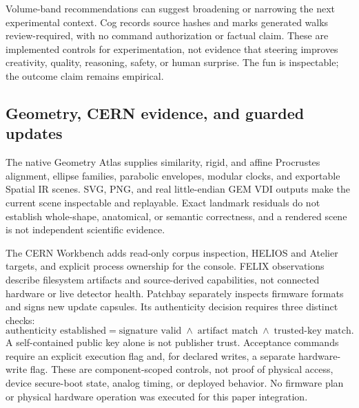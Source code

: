 \documentclass[11pt,a4paper]{article}
\begin{document}
Volume-band recommendations can suggest broadening or narrowing the next experimental context. Cog records source hashes and marks generated walks review-required, with no command authorization or factual claim. These are implemented controls for experimentation, not evidence that steering improves creativity, quality, reasoning, safety, or human surprise. The fun is inspectable; the outcome claim remains empirical.

\subsection{Geometry, CERN evidence, and guarded updates}
The native Geometry Atlas supplies similarity, rigid, and affine Procrustes alignment, ellipse families, parabolic envelopes, modular clocks, and exportable Spatial IR scenes. SVG, PNG, and real little-endian GEM VDI outputs make the current scene inspectable and replayable. Exact landmark residuals do not establish whole-shape, anatomical, or semantic correctness, and a rendered scene is not independent scientific evidence.

The CERN Workbench adds read-only corpus inspection, HELIOS and Atelier targets, and explicit process ownership for the console. FELIX observations describe filesystem artifacts and source-derived capabilities, not connected hardware or live detector health. Patchbay separately inspects firmware formats and signs new update capsules. Its authenticity decision requires three distinct checks:
\begin{equation}
\text{authenticity established}
=\text{signature valid}\;\land\;\text{artifact match}\;\land\;\text{trusted-key match}.
\end{equation}
A self-contained public key alone is not publisher trust. Acceptance commands require an explicit execution flag and, for declared writes, a separate hardware-write flag. These are component-scoped controls, not proof of physical access, device secure-boot state, analog timing, or deployed behavior. No firmware plan or physical hardware operation was executed for this paper integration.
\end{document}
